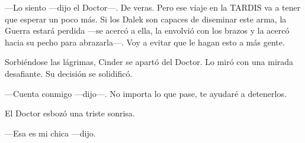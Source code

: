—Lo siento —dijo el Doctor—. De veras. Pero ese viaje en la TARDIS va a tener que esperar un poco más. Si los Dalek son capaces de diseminar este arma, la Guerra estará perdida —se acercó a ella, la envolvió con los brazos y la acercó hacia su pecho para abrazarla—. Voy a evitar que le hagan esto a más gente.

Sorbiéndose las lágrimas, Cinder se apartó del Doctor. Lo miró con una mirada desafiante. Su decisión se solidificó.

—Cuenta conmigo —dijo—. No importa lo que pase, te ayudaré a detenerlos.

El Doctor esbozó una triste sonrisa.

—Esa es mi chica —dijo.

